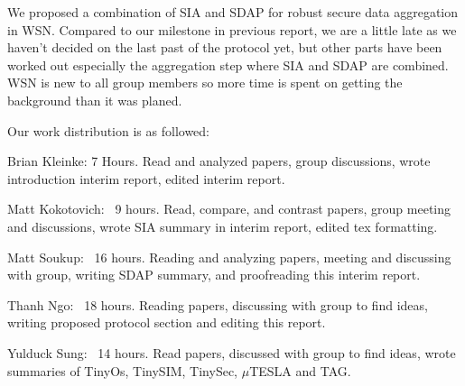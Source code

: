 \documentclass[a4paper]{article}
\begin{document}
We proposed a combination of SIA and SDAP for robust secure data aggregation
in WSN. Compared to our milestone in previous report, we are a little late as
we haven't decided on the last past of the protocol yet, but other parts have
been worked out especially the aggregation step where SIA and SDAP are
combined. WSN is new to all group members so more time is spent on getting the
background than it was planed.

Our work distribution is as followed:

Brian Kleinke: 7 Hours. Read and analyzed papers, group discussions, wrote
introduction interim report, edited interim report.

Matt Kokotovich: ~9 hours. Read, compare, and contrast papers, group meeting
and discussions, wrote SIA summary in interim report, edited tex formatting.

Matt Soukup: ~16 hours. Reading and analyzing papers, meeting and discussing
with group, writing SDAP summary, and proofreading this interim report.

Thanh Ngo: ~18 hours. Reading papers, discussing with group to find ideas,
writing proposed protocol section and editing this report.

Yulduck Sung: ~14 hours. Read papers, discussed with group to find ideas,
wrote summaries of TinyOs, TinySIM, TinySec, $\mu$TESLA and TAG.




\end{document}

